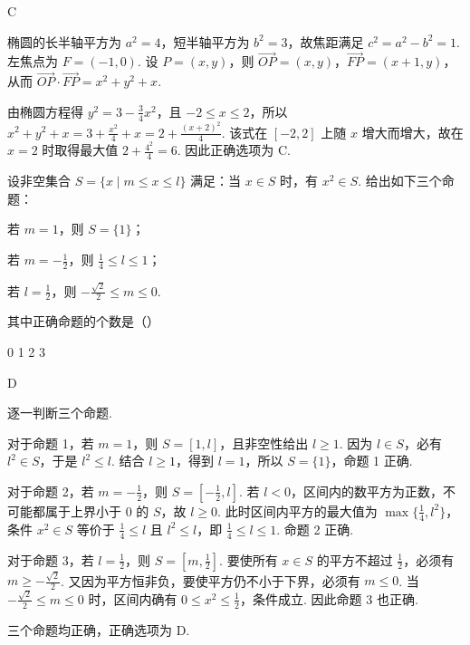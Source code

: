 \begin{answer}
C
\end{answer}

\begin{solution}
椭圆的长半轴平方为 \(a^2=4\)，短半轴平方为 \(b^2=3\)，故焦距满足 \(c^2=a^2-b^2=1\). 左焦点为 \(F=(-1,0)\). 设 \(P=(x,y)\)，则
\(\overrightarrow{OP}=(x,y)\)，\(\overrightarrow{FP}=(x+1,y)\)，从而
\(\overrightarrow{OP}\cdot\overrightarrow{FP}=x^2+y^2+x\).

由椭圆方程得 \(y^2=3-\frac{3}{4}x^2\)，且 \(-2\leqslant x\leqslant2\)，所以
\(x^2+y^2+x=3+\frac{x^2}{4}+x=2+\frac{(x+2)^2}{4}\). 该式在 \([-2,2]\) 上随 \(x\) 增大而增大，故在 \(x=2\) 时取得最大值 \(2+\frac{4^2}{4}=6\). 因此正确选项为 C.
\end{solution}

\begin{problem}
设非空集合 \( S = \{x \mid m \leqslant x \leqslant l\} \) 满足：当 \( x \in S \) 时，有 \( x^2 \in S \). 给出如下三个命题：

\begin{circlelist}
\item 若 \(m = 1\)，则 \(S = \{1\}\)；
\item 若 \(m = -\frac{1}{2}\)，则 \(\frac{1}{4} \leqslant l \leqslant 1\)；
\item 若 \(l = \frac{1}{2}\)，则 \(-\frac{\sqrt{2}}{2} \leqslant m \leqslant 0\).
\end{circlelist}

其中正确命题的个数是（\quad）

\choices
    {0}
    {1}
    {2}
    {3}
\end{problem}

\begin{answer}
D
\end{answer}

\begin{solution}
逐一判断三个命题.

对于命题 1，若 \(m=1\)，则 \(S=[1,l]\)，且非空性给出 \(l\geqslant1\). 因为 \(l\in S\)，必有 \(l^2\in S\)，于是 \(l^2\leqslant l\). 结合 \(l\geqslant1\)，得到 \(l=1\)，所以 \(S=\{1\}\)，命题 1 正确.

对于命题 2，若 \(m=-\frac12\)，则 \(S=[-\frac12,l]\). 若 \(l<0\)，区间内的数平方为正数，不可能都属于上界小于 \(0\) 的 \(S\)，故 \(l\geqslant0\). 此时区间内平方的最大值为 \(\max\{\frac14,l^2\}\)，条件 \(x^2\in S\) 等价于
\(\frac14\leqslant l\) 且 \(l^2\leqslant l\)，即 \(\frac14\leqslant l\leqslant1\). 命题 2 正确.

对于命题 3，若 \(l=\frac12\)，则 \(S=[m,\frac12]\). 要使所有 \(x\in S\) 的平方不超过 \(\frac12\)，必须有 \(m\geqslant-\frac{\sqrt2}{2}\). 又因为平方恒非负，要使平方仍不小于下界，必须有 \(m\leqslant0\). 当 \(-\frac{\sqrt2}{2}\leqslant m\leqslant0\) 时，区间内确有 \(0\leqslant x^2\leqslant\frac12\)，条件成立. 因此命题 3 也正确.

三个命题均正确，正确选项为 D.
\end{solution}

